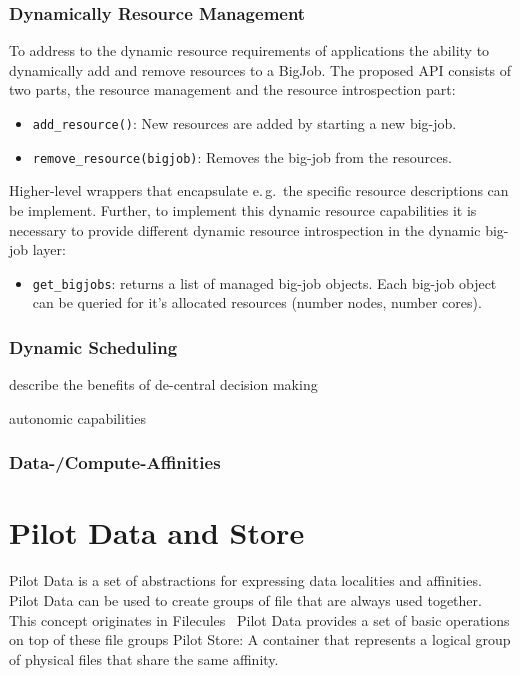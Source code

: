\documentclass[]{article}
\begin{document}
\subsubsection{Dynamically Resource Management}

To address to the dynamic resource requirements of applications the ability to
dynamically add and remove resources to a BigJob. The proposed API consists of
two parts, the resource management and the resource introspection part:
\begin{itemize}
    \item \texttt{add\_resource()}: New resources are added by starting a new
    big-job.
    \item \texttt{remove\_resource(bigjob)}: Removes the big-job from the
    resources.
\end{itemize}

Higher-level wrappers that encapsulate e.\,g.\ the specific resource
descriptions can be implement. Further, to implement this dynamic resource
capabilities it is necessary to provide different dynamic resource introspection
in the dynamic big-job layer:
\begin{itemize}
    \item \texttt{get\_bigjobs}: returns a list of managed big-job objects. Each
big-job object can be queried for it's allocated resources (number nodes, number
cores).
\end{itemize}


\subsubsection{Dynamic Scheduling}

describe the benefits of de-central decision making 

autonomic capabilities


\subsubsection{Data-/Compute-Affinities}




\section{Pilot Data and Store}

Pilot Data is a set of abstractions for expressing data localities and
affinities. Pilot Data can be used to create groups of file that are always used
together. This concept originates in
Filecules~\cite{Doraimani:2008:FGS:1383422.1383429} Pilot Data provides a set of
basic operations on top of these file groups Pilot Store: A container that
represents a logical group of physical files that share the same affinity.
\end{document}
